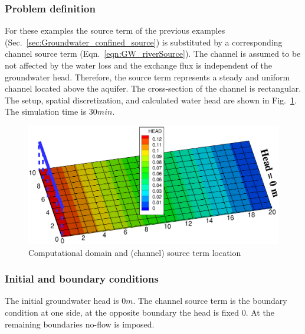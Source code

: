 \subsubsection*{Problem definition}
%
For these examples the source term of the previous examples (Sec.~\ref{sec:Groundwater_confined_source}) is substituted by a corresponding channel source term (Eqn.~\ref{eqn:GW_riverSource}). The channel is assumed to be not affected by the water loss and the exchange flux is independent of the groundwater head. Therefore, the source term represents a steady and uniform channel located above the aquifer. The cross-section of the channel is rectangular. The setup, spatial discretization, and calculated water head are shown in Fig.~\ref{GW_riv1_domain}. The simulation time is $30min$.
%
\begin{figure} [htb!]
 \centering
\includegraphics[width=0.7\columnwidth] {H_GW/figures/q_hex.eps}
\vspace{-2cm}
\caption{Computational domain and (channel) source term location}
 \label{GW_riv1_domain}
\end{figure}

%
\subsubsection*{Initial and boundary conditions}
%
The initial groundwater head is $0m$. The channel source term is the boundary condition at one side, at the opposite boundary the head is fixed $0$. At the remaining boundaries no-flow is imposed.
